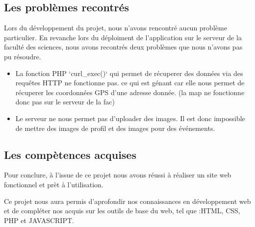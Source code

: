 \documentclass[oneside,11pt,a4paper]{article}
\begin{document}
\subsection{Les problèmes recontrés}

Lors du développement du projet, nous n'avons rencontré aucun problème particulier. En revanche lors du déploiment de l'application sur le serveur de la faculté des sciences, nous avons recontrés deux problèmes que nous n'avons pas pu résoudre.

\begin{itemize}
	\item La fonction PHP `curl\_exec()` qui permet de récuperer des données via des requêtes HTTP ne fonctionne pas. ce qui est génant car elle nous permet de récuperer les coordonnées GPS d'une adresse donnée. (la map ne fonctionne donc pas sur le serveur de la fac)
	\item Le serveur ne nous permet pas d'uploader des images. Il est donc impossible de mettre des images de profil et des images pour des événements.
\end{itemize}

\subsection{Les compètences acquises}

Pour conclure, à l’issue de ce projet nous avons réussi à réaliser un site web fonctionnel et prèt à l'utilisation. 

Ce projet nous aura permis d’aprofondir nos connaissances en développement web et de compléter nos acquis sur les outils de base du web, tel que :HTML, CSS, PHP et JAVASCRIPT.
\end{document}
